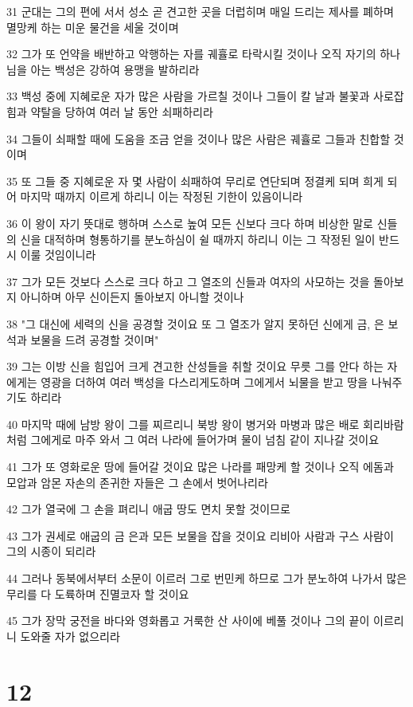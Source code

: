 \par 31 군대는 그의 편에 서서 성소 곧 견고한 곳을 더럽히며 매일 드리는 제사를 폐하며 멸망케 하는 미운 물건을 세울 것이며
\par 32 그가 또 언약을 배반하고 악행하는 자를 궤휼로 타락시킬 것이나 오직 자기의 하나님을 아는 백성은 강하여 용맹을 발하리라
\par 33 백성 중에 지혜로운 자가 많은 사람을 가르칠 것이나 그들이 칼 날과 불꽃과 사로잡힘과 약탈을 당하여 여러 날 동안 쇠패하리라
\par 34 그들이 쇠패할 때에 도움을 조금 얻을 것이나 많은 사람은 궤휼로 그들과 친합할 것이며
\par 35 또 그들 중 지혜로운 자 몇 사람이 쇠패하여 무리로 연단되며 정결케 되며 희게 되어 마지막 때까지 이르게 하리니 이는 작정된 기한이 있음이니라
\par 36 이 왕이 자기 뜻대로 행하며 스스로 높여 모든 신보다 크다 하며 비상한 말로 신들의 신을 대적하며 형통하기를 분노하심이 쉴 때까지 하리니 이는 그 작정된 일이 반드시 이룰 것임이니라
\par 37 그가 모든 것보다 스스로 크다 하고 그 열조의 신들과 여자의 사모하는 것을 돌아보지 아니하며 아무 신이든지 돌아보지 아니할 것이나
\par 38 "그 대신에 세력의 신을 공경할 것이요 또 그 열조가 알지 못하던 신에게 금, 은 보석과 보물을 드려 공경할 것이며"
\par 39 그는 이방 신을 힘입어 크게 견고한 산성들을 취할 것이요 무릇 그를 안다 하는 자에게는 영광을 더하여 여러 백성을 다스리게도하며 그에게서 뇌물을 받고 땅을 나눠주기도 하리라
\par 40 마지막 때에 남방 왕이 그를 찌르리니 북방 왕이 병거와 마병과 많은 배로 회리바람처럼 그에게로 마주 와서 그 여러 나라에 들어가며 물이 넘침 같이 지나갈 것이요
\par 41 그가 또 영화로운 땅에 들어갈 것이요 많은 나라를 패망케 할 것이나 오직 에돔과 모압과 암몬 자손의 존귀한 자들은 그 손에서 벗어나리라
\par 42 그가 열국에 그 손을 펴리니 애굽 땅도 면치 못할 것이므로
\par 43 그가 권세로 애굽의 금 은과 모든 보물을 잡을 것이요 리비아 사람과 구스 사람이 그의 시종이 되리라
\par 44 그러나 동북에서부터 소문이 이르러 그로 번민케 하므로 그가 분노하여 나가서 많은 무리를 다 도륙하며 진멸코자 할 것이요
\par 45 그가 장막 궁전을 바다와 영화롭고 거룩한 산 사이에 베풀 것이나 그의 끝이 이르리니 도와줄 자가 없으리라

\chapter{12}

